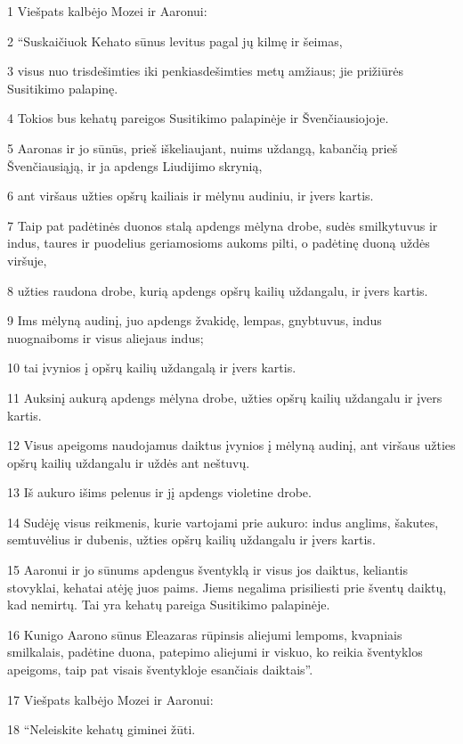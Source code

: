 \par 1 Viešpats kalbėjo Mozei ir Aaronui: 
\par 2 “Suskaičiuok Kehato sūnus levitus pagal jų kilmę ir šeimas, 
\par 3 visus nuo trisdešimties iki penkiasdešimties metų amžiaus; jie prižiūrės Susitikimo palapinę. 
\par 4 Tokios bus kehatų pareigos Susitikimo palapinėje ir Švenčiausiojoje. 
\par 5 Aaronas ir jo sūnūs, prieš iškeliaujant, nuims uždangą, kabančią prieš Švenčiausiąją, ir ja apdengs Liudijimo skrynią, 
\par 6 ant viršaus užties opšrų kailiais ir mėlynu audiniu, ir įvers kartis. 
\par 7 Taip pat padėtinės duonos stalą apdengs mėlyna drobe, sudės smilkytuvus ir indus, taures ir puodelius geriamosioms aukoms pilti, o padėtinę duoną uždės viršuje, 
\par 8 užties raudona drobe, kurią apdengs opšrų kailių uždangalu, ir įvers kartis. 
\par 9 Ims mėlyną audinį, juo apdengs žvakidę, lempas, gnybtuvus, indus nuognaiboms ir visus aliejaus indus; 
\par 10 tai įvynios į opšrų kailių uždangalą ir įvers kartis. 
\par 11 Auksinį aukurą apdengs mėlyna drobe, užties opšrų kailių uždangalu ir įvers kartis. 
\par 12 Visus apeigoms naudojamus daiktus įvynios į mėlyną audinį, ant viršaus užties opšrų kailių uždangalu ir uždės ant neštuvų. 
\par 13 Iš aukuro išims pelenus ir jį apdengs violetine drobe. 
\par 14 Sudėję visus reikmenis, kurie vartojami prie aukuro: indus anglims, šakutes, semtuvėlius ir dubenis, užties opšrų kailių uždangalu ir įvers kartis. 
\par 15 Aaronui ir jo sūnums apdengus šventyklą ir visus jos daiktus, keliantis stovyklai, kehatai atėję juos paims. Jiems negalima prisiliesti prie šventų daiktų, kad nemirtų. Tai yra kehatų pareiga Susitikimo palapinėje. 
\par 16 Kunigo Aarono sūnus Eleazaras rūpinsis aliejumi lempoms, kvapniais smilkalais, padėtine duona, patepimo aliejumi ir viskuo, ko reikia šventyklos apeigoms, taip pat visais šventykloje esančiais daiktais”. 
\par 17 Viešpats kalbėjo Mozei ir Aaronui: 
\par 18 “Neleiskite kehatų giminei žūti. 
